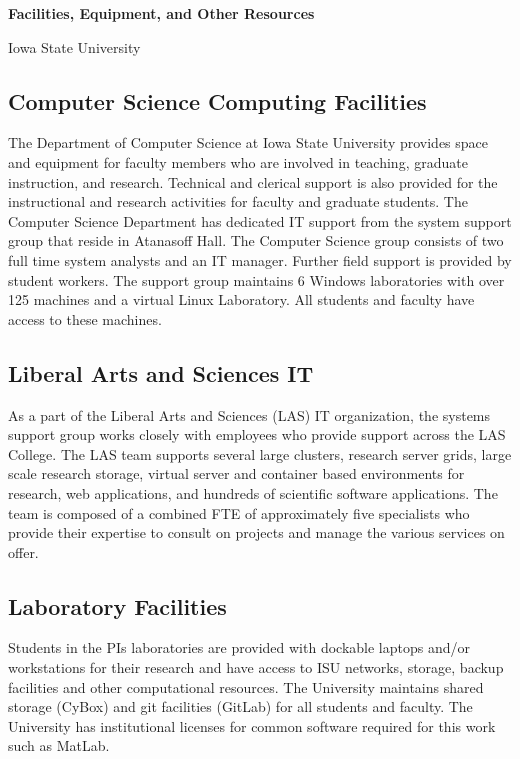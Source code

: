 \documentclass[11pt]{article}
\begin{document}
    \setcounter{page}{1}
    \begin{center}
        {\Large {\bf Facilities, Equipment, and Other Resources}}
    \end{center}

    \begin{center}
        {\Large Iowa State University}
    \end{center}

    \subsection*{Computer Science Computing Facilities}
    The Department of Computer Science at Iowa State University provides space and equipment for
    faculty members who are involved in teaching, graduate instruction,
    and research.   Technical and clerical support is also provided for
    the instructional and research activities for faculty and graduate
    students. The Computer Science Department has dedicated IT support
    from the system support group that reside in Atanasoff Hall.  The Computer Science group consists of two full time
    system analysts and an IT manager. Further field support is provided by
    student workers. The support group maintains 6 Windows laboratories
    with over 125 machines and a virtual Linux Laboratory. All students
    and faculty have access to these machines. 

    \subsection*{Liberal Arts and Sciences IT}
    As a part of the Liberal Arts and Sciences (LAS) IT organization, the systems support group
    works closely with employees who provide support across the LAS College. 
    The LAS  team supports several large clusters, research server grids,
    large scale research storage, virtual server and container based
    environments for research, web applications, and hundreds of
    scientific software applications.  The team is composed of a combined
    FTE of approximately five specialists who provide their expertise to
    consult on projects and manage the various services on offer. 

    \subsection*{Laboratory Facilities}
    Students in the PIs laboratories are provided with dockable laptops and/or workstations for their research and
    have access to ISU networks, storage, backup facilities and other computational resources. The University maintains
    shared storage (CyBox) and git facilities (GitLab) for all students
    and faculty.  The University has institutional licenses for common
    software required for this work such as MatLab. 
\end{document}
